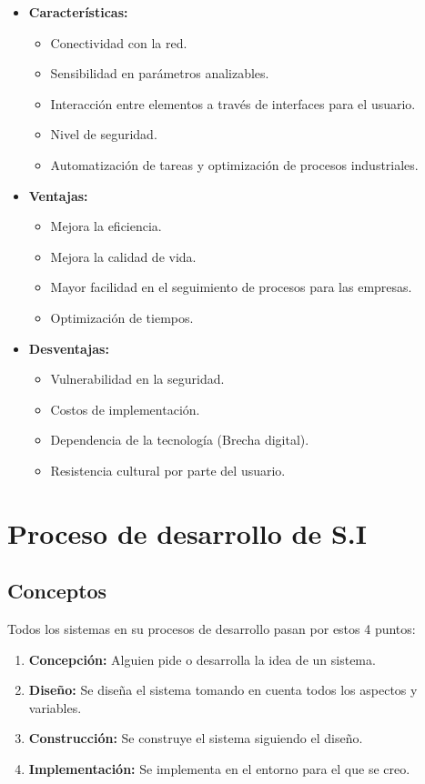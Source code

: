 \documentclass{templateNote}
\begin{document}
\begin{itemize}
    \item \textbf{Características:}
    \begin{itemize}
        \item Conectividad con la red.
        \item Sensibilidad en parámetros analizables.
        \item Interacción entre elementos a través de interfaces para el usuario.
        \item Nivel de seguridad.
        \item Automatización de tareas y optimización de procesos industriales.
    \end{itemize}
    \item \textbf{Ventajas:}
    \begin{itemize}
        \item Mejora la eficiencia.
        \item Mejora la calidad de vida.
        \item Mayor facilidad en el seguimiento de procesos para las empresas.
        \item Optimización de tiempos.
    \end{itemize}
    \item \textbf{Desventajas:}
    \begin{itemize}
        \item Vulnerabilidad en la seguridad.
        \item Costos de implementación.
        \item Dependencia de la tecnología (Brecha digital).
        \item Resistencia cultural por parte del usuario.
    \end{itemize}
\end{itemize}

\newpage


\section{Proceso de desarrollo de S.I}

\subsection{Conceptos}
\noindent Todos los sistemas en su procesos de desarrollo pasan por estos 4 puntos:
\begin{enumerate}
    \item \textbf{Concepción:} Alguien pide o desarrolla la idea de un sistema.
    \item \textbf{Diseño:} Se diseña el sistema tomando en cuenta todos los aspectos y variables.
    \item \textbf{Construcción:} Se construye el sistema siguiendo el diseño.
    \item \textbf{Implementación:} Se implementa en el entorno para el que se creo.
\end{enumerate}
\end{document}
